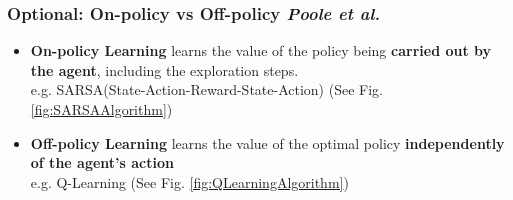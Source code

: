 \documentclass{beamer}
\begin{document}
    \begin{frame}
      \frametitle{Optional: On-policy vs Off-policy \scriptsize{\textit{Poole et al.}}}
      \begin{itemize}
        \item \textbf{On-policy Learning} learns the value of the policy being \textbf{carried out by the agent}, including the exploration steps. \\
              e.g. SARSA(State-Action-Reward-State-Action) (See Fig. \ref{fig:SARSAAlgorithm})
        \item \textbf{Off-policy Learning} learns the value of the optimal policy \textbf{independently of the agent's action} \\
              e.g. Q-Learning (See Fig. \ref{fig:QLearningAlgorithm})
      \end{itemize}
    \end{frame}
\end{document}
